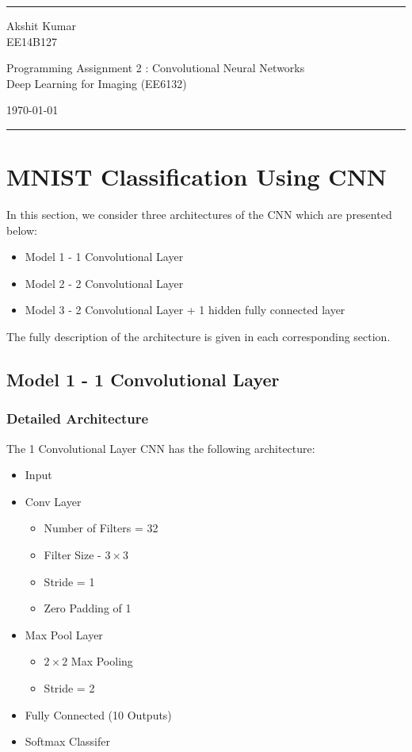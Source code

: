 \documentclass[a4paper]{article}
\begin{document}

\fancyhead[C]{}
\hrule \medskip %
\begin{minipage}{0.295\textwidth} 
\raggedright
\footnotesize
Akshit Kumar \hfill\\   
EE14B127\hfill\\
\end{minipage}
\begin{minipage}{0.4\textwidth} 
\centering 
\large 
Programming Assignment 2 : Convolutional Neural Networks\\ 
\normalsize 
Deep Learning for Imaging (EE6132)\\ 
\end{minipage}
\begin{minipage}{0.295\textwidth} 
\raggedleft
\today\hfill\\
\end{minipage}
\medskip\hrule 
\bigskip

\tableofcontents
\section{MNIST Classification Using CNN}
In this section, we consider three architectures of the CNN which are presented below:
\begin{itemize}
\item Model 1 - 1 Convolutional Layer 
\item Model 2 - 2 Convolutional Layer 
\item Model 3 - 2 Convolutional Layer + 1 hidden fully connected layer 
\end{itemize}
The fully description of the architecture is given in each corresponding section.
\subsection{Model 1 - 1 Convolutional Layer}
\subsubsection{Detailed Architecture}
The 1 Convolutional Layer CNN has the following architecture:
\begin{itemize}
\item Input
\item Conv Layer
	\begin{itemize}
	\item Number of Filters = 32
	\item Filter Size - $3 \times 3$
    \item Stride = 1
    \item Zero Padding of 1
	\end{itemize}
\item Max Pool Layer
\begin{itemize}
\item $2\times2$ Max Pooling
\item Stride = 2
\end{itemize}
\item Fully Connected (10 Outputs)
\item Softmax Classifer
\end{itemize}
\end{document}
